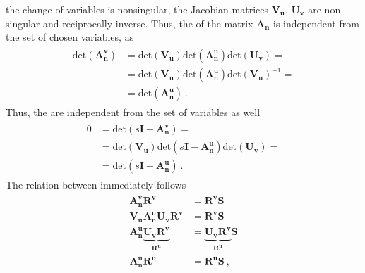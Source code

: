 \documentclass[letterpaper,10pt,english]{jupyterBook}
\begin{document}
\sphinxAtStartPar
{} the change of variables is non\sphinxhyphen{}singular, the Jacobian matrices \(\mathbf{V}_\mathbf{u}\), \(\mathbf{U}_\mathbf{v}\) are non singular and reciprocally inverse. Thus, the  of the matrix \(\mathbf{A}_{\mathbf{n}}\) is independent from the set of chosen variables, as
\begin{equation*}
\begin{split}\begin{aligned}
 \text{det}\left( \mathbf{A}_{\mathbf{n}}^{\mathbf{v}} \right) 
 & = \text{det}\left( \mathbf{V}_{\mathbf{u}} \right) \text{det}\left( \mathbf{A}_{\mathbf{n}}^{\mathbf{u}} \right) \text{det}\left( \mathbf{U}_{\mathbf{v}} \right) = \\
 & = \text{det}\left( \mathbf{V}_{\mathbf{u}} \right) \text{det}\left( \mathbf{A}_{\mathbf{n}}^{\mathbf{u}} \right) \text{det}\left( \mathbf{V}_{\mathbf{u}} \right)^{-1} = \\
 & = \text{det}\left( \mathbf{A}_{\mathbf{n}}^{\mathbf{u}} \right) \ .
\end{aligned}\end{split}
\end{equation*}
\sphinxAtStartPar
Thus, the  are independent from the set of variables as well
\begin{equation*}
\begin{split}\begin{aligned}
  0 & = \text{det}\left( s \mathbf{I} - \mathbf{A}^{\mathbf{v}}_{\mathbf{n}} \right) = \\
    & = \text{det} \left( \mathbf{V}_{\mathbf{u}} \right) \text{det}\left( s \mathbf{I} - \mathbf{A}^{\mathbf{u}}_{\mathbf{n}} \right) \text{det} \left( \mathbf{U}_{\mathbf{v}} \right) = \\
    & = \text{det}\left( s \mathbf{I} - \mathbf{A}^{\mathbf{u}}_{\mathbf{n}} \right) \ .
\end{aligned}\end{split}
\end{equation*}
\sphinxAtStartPar
The relation between  immediately follows
\begin{equation*}
\begin{split}\begin{aligned}
  \mathbf{A}^{\mathbf{v}}_{\mathbf{n}} \mathbf{R}^\mathbf{v} & = \mathbf{R}^\mathbf{v} \mathbf{S} \\
  \mathbf{V}_{\mathbf{u}} \mathbf{A}^{\mathbf{u}}_{\mathbf{n}} \mathbf{U}_{\mathbf{v}} \mathbf{R}^\mathbf{v} & = \mathbf{R}^\mathbf{v} \mathbf{S} \\
  \mathbf{A}^{\mathbf{u}}_{\mathbf{n}} \underbrace{\mathbf{U}_{\mathbf{v}} \mathbf{R}^\mathbf{v}}_{\mathbf{R}^\mathbf{u}} & = \underbrace{\mathbf{U}_{\mathbf{v}} \mathbf{R}^\mathbf{v}}_{\mathbf{R}^\mathbf{u}} \mathbf{S} \\
  \mathbf{A}^{\mathbf{u}}_{\mathbf{n}} \mathbf{R}^\mathbf{u} & = \mathbf{R}^\mathbf{u} \mathbf{S} \ ,
\end{aligned}\end{split}
\end{equation*}
\end{document}
